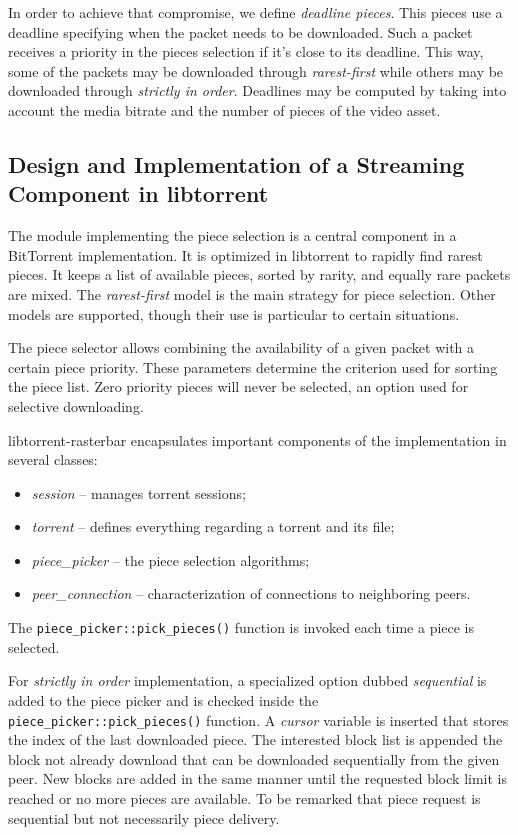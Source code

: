 In order to achieve that compromise, we define \textit{deadline pieces}. This
pieces use a deadline specifying when the packet needs to be downloaded. Such
a packet receives a priority in the pieces selection if it's close to its
deadline. This way, some of the packets may be downloaded through
\textit{rarest-first} while others may be downloaded through \textit{strictly
in order}. Deadlines may be computed by taking into account the media bitrate
and the number of pieces of the video asset.

\subsection{Design and Implementation of a Streaming Component in libtorrent}
\label{subsec:multimedia-dist:libtorrent-design}

The module implementing the piece selection is a central component in a
BitTorrent implementation. It is optimized in libtorrent to rapidly find
rarest pieces. It keeps a list of available pieces, sorted by rarity, and
equally rare packets are mixed. The \textit{rarest-first} model is the main
strategy for piece selection. Other models are supported, though their use is
particular to certain situations.

The piece selector allows combining the availability of a given packet with a
certain piece priority. These parameters determine the criterion used for
sorting the piece list. Zero priority pieces will never be selected, an option
used for selective downloading.

libtorrent-rasterbar encapsulates important components of the implementation
in several classes:
\begin{itemize}
  \item \textit{session} -- manages torrent sessions;
  \item \textit{torrent} -- defines everything regarding a torrent and its
  file;
  \item \textit{piece\_picker} -- the piece selection algorithms;
  \item \textit{peer\_connection} -- characterization of connections to
  neighboring peers.
\end{itemize}

The \texttt{piece\_picker::pick\_pieces()} function is invoked each time a
piece is selected.

For \textit{strictly in order} implementation, a specialized option dubbed
\textit{sequential} is added to the piece picker and is checked inside the
\texttt{piece\_picker::pick\_pieces()} function. A \textit{cursor} variable is
inserted that stores the index of the last downloaded piece. The interested
block list is appended the block not already download that can be downloaded
sequentially from the given peer. New blocks are added in the same manner
until the requested block limit is reached or no more pieces are available. To
be remarked that piece request is sequential but not necessarily piece
delivery.

